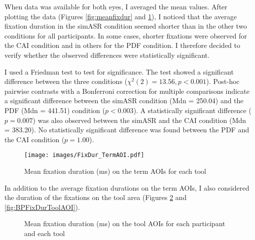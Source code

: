 When data was available for both eyes, I averaged the mean values. After plotting the data (Figures \ref{fig:meanfixdur} and \ref{fig:BPFixDurTermAOI}), I noticed that the average fixation duration in the simASR condition seemed shorter than in the other two conditions for all participants. In some cases, shorter fixations were observed for the CAI condition and in others for the PDF condition. I therefore decided to verify whether the observed differences were statistically significant.

I used a Friedman test to test for significance. The test showed a significant difference between the three conditions ($\chi^2(2) = 13.56, p < 0.001$). Post-hoc pairwise contrasts with a Bonferroni correction for multiple comparisons indicate a significant difference between the simASR condition (Mdn = 250.04) and the PDF (Mdn = 441.51) condition ($p < 0.003$). A statistically significant difference ($p = 0.007$) was also observed between the simASR and the CAI condition (Mdn = 383.20). No statistically significant difference was found between the PDF and the CAI condition ($p = 1.00$).

\begin{figure}
\texttt{[image: images/FixDur\_TermAOI.pdf]}
\caption[Boxplot of mean fixation duration on term AOIs]{Mean fixation duration (ms) on the term AOIs for each tool}
\label{fig:BPFixDurTermAOI}
\end{figure}

In addition to the average fixation durations on the term AOIs, I also considered the duration of the fixations on the tool area (Figures \ref{fig:FixDurToolP} and \ref{fig:BPFixDurToolAOI}).

\begin{figure}
\caption[Mean fixation duration on tool AOI for each condition]{Mean fixation duration (ms) on the tool AOIs for each participant and each tool}
\label{fig:FixDurToolP}
\end{figure}

